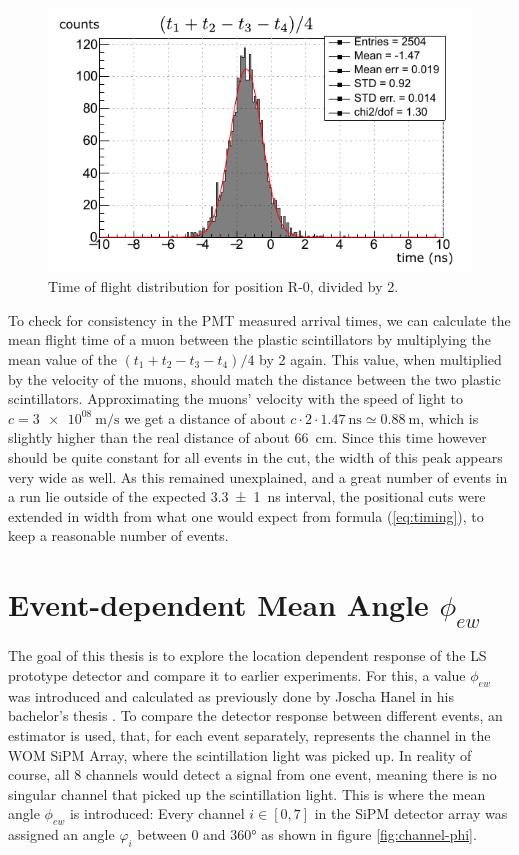 \begin{figure}[h]
	\centering
	\includegraphics[width=.7\textwidth]{pictures/time-resolution.pdf}
	\caption{Time of flight distribution for position R-0, divided by 2. }
	\label{fig:time-resolution}
\end{figure}

To check for consistency in the \ac{PMT} measured arrival times, we can calculate the mean flight time of a muon between the plastic scintillators by multiplying the mean value of the $(t_1 + t_2 - t_3 - t_4)/4$ by 2 again. This value, when multiplied by the velocity of the muons, should match the distance between the two plastic scintillators. Approximating the muons' velocity with the speed of light to $c = \SI{3e08}{\meter\per\second}$ we get a distance of about $ c \cdot 2 \cdot \SI{1.47}{\nano\second} \simeq \SI{0.88}{\meter}$, which is slightly higher than the real distance of about \SI{66}{\centi\meter}. Since this time however should be quite constant for all events in the cut, the width of this peak appears very wide as well. 
As this remained unexplained, and a great number of events in a run lie outside of the expected \SI{3.3 \pm 1}{\nano\second} interval, the positional cuts were extended in width from what one would expect from formula (\ref{eq:timing}), to keep a reasonable number of events. 





\section{Event-dependent Mean Angle \texorpdfstring{$\phi_{ew}$}{}}

	The goal of this thesis is to explore the location dependent response of the \ac{LS} prototype detector and compare it to earlier experiments. 
	For this, a value $\phi_{ew}$ was introduced and calculated as previously done by Joscha Hanel in his bachelor's thesis \cite{HANEL}.
	To compare the detector response between different events, an estimator is used, that, for each event separately, represents the channel in the \ac{WOM} \ac{SiPM} Array, where the scintillation light was picked up.
	In reality of course, all 8 channels would detect a signal from one event, meaning there is no singular channel that picked up the scintillation light. 
	This is where the mean angle $\phi_{ew}$ is introduced:
	Every channel $i \in [0,7]$ in the \ac{SiPM} detector array was assigned an angle $\varphi_i$ between 0 and 360° as shown in figure \ref{fig:channel-phi}.
	
